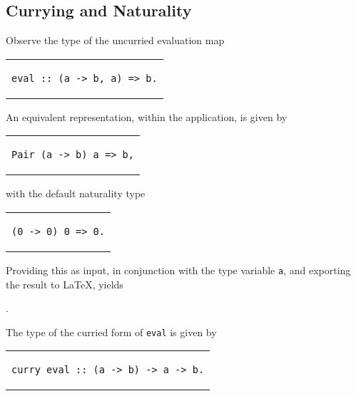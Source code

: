 \documentclass[../Dissertation.tex]{subfiles}
\begin{document}
\subsection{Currying and Naturality}

Observe the type of the uncurried evaluation map
\begin{center}
\begin{tabular}{c}
\begin{lstlisting}
eval :: (a -> b, a) => b.
\end{lstlisting}
\end{tabular}
\end{center}
An equivalent representation, within the application, is given by
\begin{center}
\begin{tabular}{c}
\begin{lstlisting}
Pair (a -> b) a => b,
\end{lstlisting}
\end{tabular}
\end{center}
with the default naturality type
\begin{center}
\begin{tabular}{c}
\begin{lstlisting}
(0 -> 0) 0 => 0.
\end{lstlisting}
\end{tabular}
\end{center}
Providing this as input, in conjunction with the type variable \lstinline{a}, and exporting the result to LaTeX, yields
\begin{center}
  .
\end{center}
The type of the curried form of \lstinline{eval} is given by
\begin{center}
\begin{tabular}{c}
\begin{lstlisting}
curry eval :: (a -> b) -> a -> b.
\end{lstlisting}
\end{tabular}
\end{center}
\end{document}
